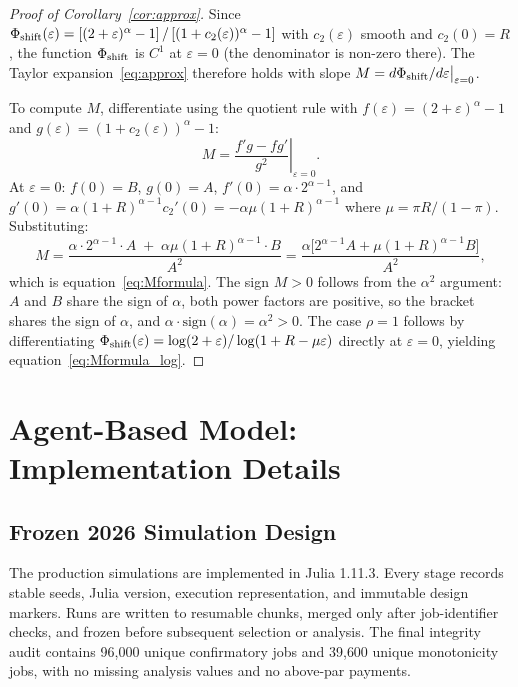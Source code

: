 \documentclass[12pt]{article}\usepackage[]{graphicx}\usepackage[]{xcolor}
\begin{document}
\begin{proof}[Proof of Corollary~\ref{cor:approx}]
Since $\Phi_{\rm shift}(\varepsilon) = [(2+\varepsilon)^\alpha - 1]\,/\, [(1+c_2(\varepsilon))^\alpha - 1]$ with $c_2(\varepsilon)$ smooth and $c_2(0) = R$, the function $\Phi_{\rm shift}$ is $C^1$ at $\varepsilon = 0$ (the denominator is non-zero there).
The Taylor expansion~\eqref{eq:approx} therefore holds with slope $M = d\Phi_{\rm shift}/d\varepsilon\big|_{\varepsilon=0}$.

To compute $M$, differentiate using the quotient rule with $f(\varepsilon) = (2+\varepsilon)^\alpha - 1$ and $g(\varepsilon) = (1+c_2(\varepsilon))^\alpha - 1$: \[ M = \left.\frac{f'g - fg'}{g^2}\right|_{\varepsilon=0}. \] At $\varepsilon = 0$: $f(0)=B$, $g(0)=A$, $f'(0) = \alpha\cdot 2^{\alpha-1}$, and $g'(0) = \alpha(1+R)^{\alpha-1}c_2'(0)=-\alpha\mu(1+R)^{\alpha-1}$ where $\mu = \pi R/(1-\pi)$.
Substituting: \[ M = \frac{\alpha\cdot 2^{\alpha-1}\cdot A \;+\; \alpha\mu(1+R)^{\alpha-1}\cdot B}{A^2} = \frac{\alpha\bigl[2^{\alpha-1}A + \mu(1+R)^{\alpha-1}B\bigr]}{A^2}, \] which is equation~\eqref{eq:Mformula}.
The sign $M > 0$ follows from the $\alpha^2$ argument: $A$ and $B$ share the sign of $\alpha$, both power factors are positive, so the bracket shares the sign of $\alpha$, and $\alpha\cdot \mathrm{sign}(\alpha) = \alpha^2 > 0$.
The case $\rho = 1$ follows by differentiating $\Phi_{\rm shift}(\varepsilon) = \log(2+\varepsilon)/\log(1+R-\mu\varepsilon)$ directly at $\varepsilon = 0$, yielding equation~\eqref{eq:Mformula_log}.
\end{proof}

\section{Agent-Based Model: Implementation Details}
\label{app:abm}

\subsection{Frozen 2026 Simulation Design}

The production simulations are implemented in Julia 1.11.3.
Every stage records stable seeds, Julia version, execution representation, and immutable design markers.
Runs are written to resumable chunks, merged only after job-identifier checks, and frozen before subsequent selection or analysis.
The final integrity audit contains 96{,}000 unique confirmatory jobs and 39{,}600 unique monotonicity jobs, with no missing analysis values and no above-par payments.
\end{document}
